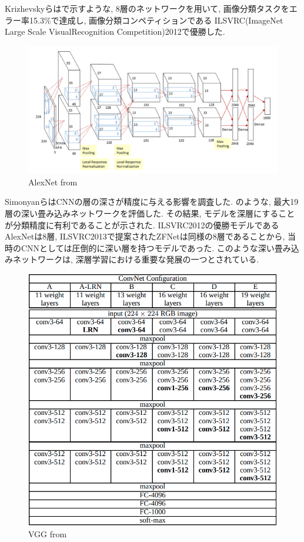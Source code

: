 Krizhevskyら\cite{AlexNet}はで示すような, 8層のネットワークを用いて, 画像分類タスクをエラー率15.3\%で達成し, 画像分類コンペティションである ILSVRC(ImageNet Large Scale VisualRecognition Competition)2012で優勝した.
\begin{figure}[hbtp]
  \centering
 \includegraphics[keepaspectratio, scale=0.55]
      {images/AlexNet.png}
 \caption{AlexNet from \cite{AlexNet}}
 \label{Fig:AlexNet}
\end{figure}
\newpage
Simonyan\cite{simonyan}らはCNNの層の深さが精度に与える影響を調査した. のような, 最大19層の深い畳み込みネットワークを評価した. その結果, モデルを深層にすることが分類精度に有利であることが示された.
ILSVRC2012の優勝モデルであるAlexNetは8層, ILSVRC2013で提案されたZFNetは同様の8層であることから, 当時のCNNとしては圧倒的に深い層を持つモデルであった. このような深い畳み込みネットワークは, 深層学習における重要な発展の一つとされている.
\begin{figure}[hbtp]
  \centering
 \includegraphics[keepaspectratio, scale=0.5]
      {images/VGG2.png}
 \caption{VGG from \cite{AlexNet}}
 \label{Fig:VGG}
\end{figure}


